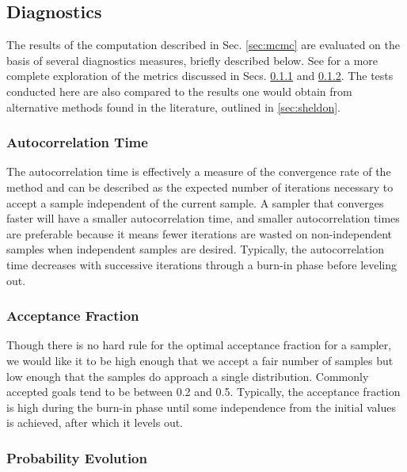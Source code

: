 \documentclass[preprint]{aastex}
\begin{document}
\clearpage
\subsection{Diagnostics}
\label{sec:diag}

The results of the computation described in Sec. \ref{sec:mcmc} are evaluated on the basis of several diagnostics measures, briefly described below.  See \citet{for12} for a more complete exploration of the metrics discussed in Secs. \ref{sec:acorr} and \ref{sec:afrac}.  The tests conducted here are also compared to the results one would obtain from alternative methods found in the literature, outlined in \ref{sec:sheldon}.

\clearpage
\subsubsection{Autocorrelation Time}
\label{sec:acorr}

The autocorrelation time is effectively a measure of the convergence rate of the method and can be described as the expected number of iterations necessary to accept a sample independent of the current sample.  A sampler that converges faster will have a smaller autocorrelation time, and smaller autocorrelation times are preferable because it means fewer iterations are wasted on non-independent samples when independent samples are desired.  Typically, the autocorrelation time decreases with successive iterations through a burn-in phase before leveling out.

\clearpage
\subsubsection{Acceptance Fraction}
\label{sec:afrac}

Though there is no hard rule for the optimal acceptance fraction for a sampler, we would like it to be high enough that we accept a fair number of samples but low enough that the samples do approach a single distribution.  Commonly accepted goals tend to be between 0.2 and 0.5.  Typically, the acceptance fraction is high during the burn-in phase until some independence from the initial values is achieved, after which it levels out.

\clearpage
\subsubsection{Probability Evolution}
\label{sec:probs}
\end{document}
